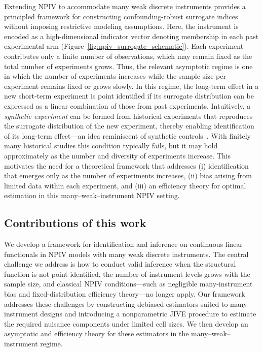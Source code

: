 \documentclass[11pt]{article}
\theoremstyle{plain}
\theoremstyle{definition}
\theoremstyle{remark}
\theoremstyle{definition}
\begin{document}
 
Extending NPIV to accommodate many weak discrete instruments provides a principled framework for constructing confounding-robust surrogate indices without imposing restrictive modeling assumptions.  
Here, the instrument is encoded as a high-dimensional indicator vector denoting membership in each past experimental arm (Figure~\ref{fig:npiv_surrogate_schematic}).  
Each experiment contributes only a finite number of observations, which may remain fixed as the total number of experiments grows.  
Thus, the relevant asymptotic regime is one in which the number of experiments increases while the sample size per experiment remains fixed or grows slowly. In this regime, the long-term effect in a new short-term experiment is point identified if its surrogate distribution can be expressed as a linear combination of those from past experiments.  
Intuitively, a \emph{synthetic experiment} can be formed from historical experiments that reproduces the surrogate distribution of the new experiment, thereby enabling identification of its long-term effect---an idea reminiscent of synthetic controls~\citep{abadie2015comparative}.  
With finitely many historical studies this condition typically fails, but it may hold approximately as the number and diversity of experiments increase.  
This motivates the need for a theoretical framework that addresses (i) identification that emerges only as the number of experiments increases, (ii) bias arising from limited data within each experiment, and (iii) an efficiency theory for optimal estimation in this many--weak--instrument NPIV setting.


 

\subsection{Contributions of this work}

We develop a framework for identification and inference on continuous linear
functionals in NPIV models with many weak discrete instruments. The central
challenge we address is how to conduct valid inference when the structural
function is not point identified, the number of instrument levels grows with the
sample size, and classical NPIV conditions---such as negligible many-instrument
bias and fixed-distribution efficiency theory---no longer apply. Our framework
addresses these challenges by constructing debiased estimators suited to
many-instrument designs and introducing a nonparametric JIVE procedure to
estimate the required nuisance components under limited cell sizes. We then
develop an asymptotic and efficiency theory for these estimators in the
many--weak--instrument regime.
\end{document}
